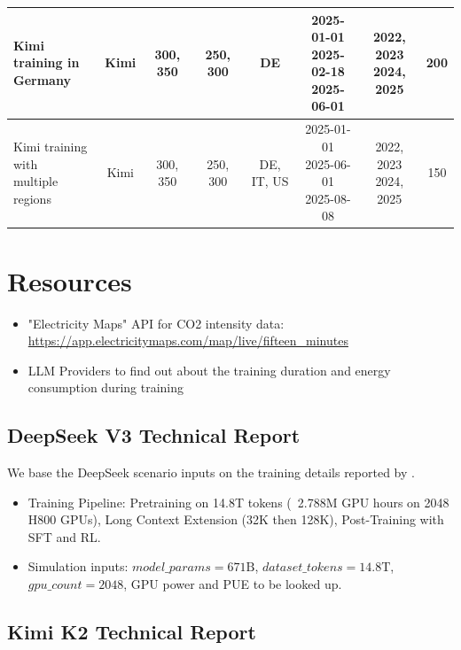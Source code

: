 {\begin{tabular}{l|c|c|c|c|c|c|c}
    \hline
    \makecell{Kimi training in \\ Germany} & Kimi & 300, 350 & 250, 300 & DE & \makecell{2025-01-01 \\ 2025-02-18 \\ 2025-06-01} & \makecell{2022, 2023 \\ 2024, 2025} & 200 \\
    \hline
    \makecell{Kimi training with \\ multiple regions} & Kimi & 300, 350 & 250, 300 & DE, IT, US & \makecell{2025-01-01 \\ 2025-06-01 \\ 2025-08-08} & \makecell{2022, 2023 \\ 2024, 2025} & 150 \\
    \bottomrule
  \end{tabular}%
}

\section{Resources}

\begin{itemize}
  \item "Electricity Maps" API for CO2 intensity data: \url{https://app.electricitymaps.com/map/live/fifteen_minutes}
  \item LLM Providers to find out about the training duration and energy consumption during training
\end{itemize}

\subsection{DeepSeek V3 Technical Report}

We base the DeepSeek scenario inputs on the training details reported by
\textcite{deepseek-ai_deepseek-v3_2024}.

\begin{itemize}
  \item Training Pipeline: Pretraining on 14.8T tokens (~2.788M GPU hours on 2048 H800 GPUs), Long Context Extension (32K then 128K), Post-Training with SFT and RL.
  \item Simulation inputs: $\mathit{model\_params}=671\mathrm{B}$, $\mathit{dataset\_tokens}=14.8\mathrm{T}$, $\mathit{gpu\_count}=2048$, GPU power and PUE to be looked up.
\end{itemize}

\subsection{Kimi K2 Technical Report}

